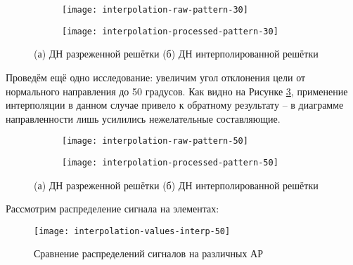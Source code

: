 \begin{figure}[H]
    \centering
    \begin{subfigure}[b]{0.49\textwidth}
        \centering
        \hspace*{-3ex}
        \texttt{[image: interpolation-raw-pattern-30]}
        \caption{}%
    \end{subfigure}
    \hfill
    \begin{subfigure}[b]{0.49\textwidth}
        \centering
        \hspace*{-3ex}
        \texttt{[image: interpolation-processed-pattern-30]}
        \caption{}%
        \label{fig:interpolation-processed-pattern-30}
    \end{subfigure}
    \caption{%
    (а) ДН разреженной решётки
    (б) ДН интерполированной решётки
    }%
    \label{fig:interpolation-pattern-30}
\end{figure}

Проведём ещё одно исследование: увеличим угол отклонения цели от нормального направления до 50 градусов. 
Как видно на Рисунке \ref{fig:interpolation-processed-pattern-50}, применение интерполяции в данном случае 
привело к обратному результату -- в диаграмме направленности лишь усилились нежелательные составляющие. 

\begin{figure}[H]
    \centering
    \begin{subfigure}[b]{0.49\textwidth}
        \centering
        \hspace*{-3ex}
        \texttt{[image: interpolation-raw-pattern-50]}
        \caption{}%
    \end{subfigure}
    \hfill
    \begin{subfigure}[b]{0.49\textwidth}
        \centering
        \hspace*{-3ex}
        \texttt{[image: interpolation-processed-pattern-50]}
        \caption{}%
        \label{fig:interpolation-processed-pattern-50}
    \end{subfigure}
    \caption{%
    (а) ДН разреженной решётки
    (б) ДН интерполированной решётки
    }%
    \label{fig:interpolation-pattern-50}
\end{figure}

Рассмотрим распределение сигнала на элементах:

\begin{figure}[H]
    \centering
    \texttt{[image: interpolation-values-interp-50]}
    \caption{Сравнение распределений сигналов на различных АР}
    \label{fig:interpolation-values-interp-50}
\end{figure}


